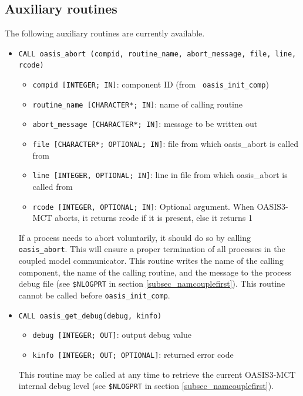 
\subsection{Auxiliary routines}
\label{subsubsec_auxroutines}

The following auxiliary routines are currently available.

\begin{itemize}
\item {\tt CALL oasis\_abort (compid, routine\_name, abort\_message, file, line, rcode)}
  \begin{itemize}
  \item {\tt compid [INTEGER; IN]}: component ID (from {\tt
      oasis\_init\_comp})
  \item {\tt routine\_name [CHARACTER*; IN]}: name of calling routine
  \item {\tt abort\_message [CHARACTER*; IN]}: message to be written out
  \item {\tt file [CHARACTER*; OPTIONAL; IN]}: file from which oasis\_abort is called from
  \item {\tt line [INTEGER, OPTIONAL; IN]}: line in file from which oasis\_abort is called from
  \item {\tt rcode [INTEGER, OPTIONAL; IN]}: Optional argument. When OASIS3-MCT
    aborts, it returns rcode if it is present, else it returns 1
  \end{itemize}

  If a process needs to abort voluntarily, it should do so by calling
  {\tt oasis\_abort}. This will ensure a proper termination of all
  processes in the coupled model communicator. This routine writes the
  name of the calling component, the name of the calling routine, and the
  message to the process debug file (see {\tt \$NLOGPRT} in section
  \ref{subsec_namcouplefirst}).  This routine cannot be called before
  {\tt oasis\_init\_comp}.

  \vspace{0.2cm}
\item {\tt CALL oasis\_get\_debug(debug, kinfo)}
  \begin{itemize}
  \item {\tt debug [INTEGER; OUT]}: output debug value
  \item {\tt kinfo [INTEGER; OUT; OPTIONAL]}: returned error code
  \end{itemize}

  This routine may be called at any time to retrieve the current
  OASIS3-MCT internal debug level (see {\tt \$NLOGPRT} in section
  \ref{subsec_namcouplefirst}).  


\end{itemize}
